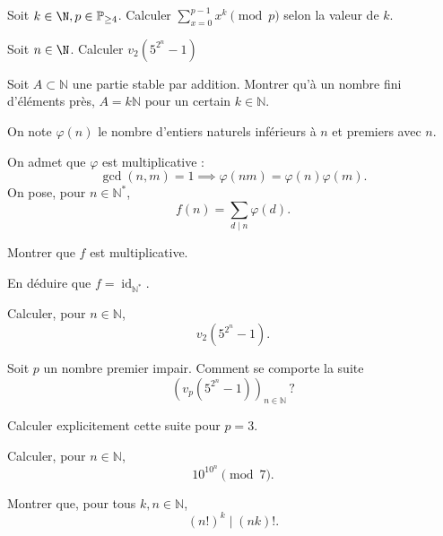 \documentclass[11pt,a4paper]{article}
\begin{document}
\begin{exercise}
Soit $k\in\N, p\in\mathbb{P}_{\ge4}$. 
Calculer $\displaystyle\sum_{x=0}^{p-1} x^k\pmod{p}$ selon la valeur de $k$.
\end{exercise}

\begin{exercise}
Soit $n\in\N$. Calculer $v_2(5^{2^n}-1)$
\end{exercise}

\begin{exercise}
Soit $A\subset\mathbb{N}$ une partie stable par addition.
Montrer qu'à un nombre fini d'éléments près,
$A=k\mathbb{N}$ pour un certain $k\in\mathbb{N}$.
\end{exercise}

\begin{exercise}
On note $\varphi(n)$ le nombre d'entiers naturels inférieurs
à $n$ et premiers avec $n$.

On admet que $\varphi$ est multiplicative :
\[
    \gcd(n,m)=1
    \implies
    \varphi(nm)=\varphi(n)\varphi(m).
\]
On pose, pour $n\in\mathbb{N}^*$,
\[
    f(n)=\sum_{d\mid n}\varphi(d).
\]
\begin{questions}
    \item Montrer que $f$ est multiplicative.
    \item En déduire que $f=\operatorname{id}_{\mathbb{N}^*}$.
\end{questions}
\end{exercise}

\begin{exercise}
\begin{questions}
    \item Calculer, pour $n\in\mathbb{N}$,
    \[
        v_2\left(5^{2^n}-1\right).
    \]
    \item Soit $p$ un nombre premier impair.
    Comment se comporte la suite
    \[
        \left(v_p\left(5^{2^n}-1\right)\right)_{n\in\mathbb{N}}\,?
    \]
    \item Calculer explicitement cette suite pour $p=3$.
\end{questions}
\end{exercise}

\begin{exercise}
Calculer, pour $n\in\mathbb{N}$,
\[
    10^{10^n}\pmod{7}.
\]
\end{exercise}

\begin{exercise}
Montrer que, pour tous $k,n\in\mathbb{N}$,
\[
    (n!)^k\mid(nk)!.
\]
\end{exercise}
\end{document}
